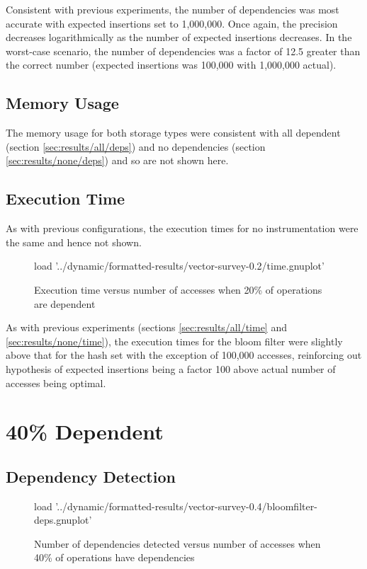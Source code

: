 	Consistent with previous experiments, the number of dependencies was most accurate with expected insertions set to 1,000,000. Once again, the precision decreases logarithmically as the number of expected insertions decreases. In the worst-case scenario, the number of dependencies was a factor of 12.5 greater than the correct number (expected insertions was 100,000 with 1,000,000 actual).
	
	\subsection{Memory Usage} \label{sec:results/20/mem}
	The memory usage for both storage types were consistent with all dependent (section \ref{sec:results/all/deps}) and no dependencies (section \ref{sec:results/none/deps}) and so are not shown here.
	
	\subsection{Execution Time} \label{sec:results/20/time}
	As with previous configurations, the execution times for no instrumentation were the same and hence not shown.
	
	\begin{figure}
		\centering
		\begin{gnuplot}[terminal=pdf]
			load '../dynamic/formatted-results/vector-survey-0.2/time.gnuplot'
		\end{gnuplot}
		\caption{Execution time versus number of accesses when 20\% of operations are dependent}
		\label{chart:20-time}
	\end{figure}
	
	As with previous experiments (sections \ref{sec:results/all/time} and \ref{sec:results/none/time}), the execution times for the bloom filter were slightly above that for the hash set with the exception of 100,000 accesses, reinforcing out hypothesis of expected insertions being a factor 100 above actual number of accesses being optimal.

\section{40\% Dependent} \label{sec:results/40}
	\subsection{Dependency Detection} \label{sec:results/40/deps}
	\begin{figure}
		\centering
		\begin{gnuplot}[terminal=pdf]
		load  '../dynamic/formatted-results/vector-survey-0.4/bloomfilter-deps.gnuplot'
		\end{gnuplot}
		\caption{Number of dependencies detected versus number of accesses when 40\% of operations have dependencies}
		\label{chart:40-dep}
	\end{figure}
	
